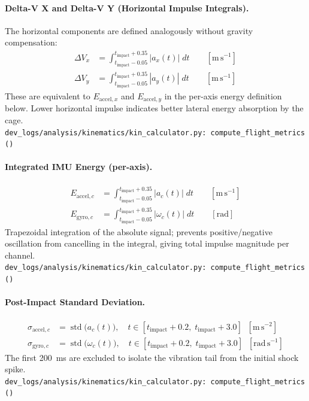 \paragraph{Delta-V X and Delta-V Y (Horizontal Impulse Integrals).}
The horizontal components are defined analogously without gravity compensation:
\begin{align}
    \Delta V_x &= \int_{t_{\text{impact}}-0.05}^{t_{\text{impact}}+0.35} |a_x(t)| \; dt \qquad [\mathrm{m\,s^{-1}}] \\
    \Delta V_y &= \int_{t_{\text{impact}}-0.05}^{t_{\text{impact}}+0.35} |a_y(t)| \; dt \qquad [\mathrm{m\,s^{-1}}]
\end{align}
These are equivalent to $E_{\text{accel},x}$ and $E_{\text{accel},y}$ in the per-axis energy definition below. Lower horizontal impulse indicates better lateral energy absorption by the cage.\\
\texttt{\small dev\_logs/analysis/kinematics/kin\_calculator.py:\ compute\_flight\_metrics()}

\medskip
\paragraph{Integrated IMU Energy (per-axis).}
\begin{align}
    E_{\text{accel},c} &= \int_{t_{\text{impact}}-0.05}^{t_{\text{impact}}+0.35} |a_c(t)| \; dt \qquad [\mathrm{m\,s^{-1}}] \\
    E_{\text{gyro},c}  &= \int_{t_{\text{impact}}-0.05}^{t_{\text{impact}}+0.35} |\omega_c(t)| \; dt \qquad [\mathrm{rad}]
\end{align}
Trapezoidal integration of the absolute signal; prevents positive/negative oscillation from cancelling in the integral, giving total impulse magnitude per channel.\\
\texttt{\small dev\_logs/analysis/kinematics/kin\_calculator.py:\ compute\_flight\_metrics()}

\medskip
\paragraph{Post-Impact Standard Deviation.}
\begin{align}
    \sigma_{\text{accel},c} &= \operatorname{std}\bigl(a_c(t)\bigr),\quad t \in [t_{\text{impact}} + 0.2,\; t_{\text{impact}} + 3.0] \;\;[\mathrm{m\,s^{-2}}] \\
    \sigma_{\text{gyro},c}  &= \operatorname{std}\bigl(\omega_c(t)\bigr),\quad t \in [t_{\text{impact}} + 0.2,\; t_{\text{impact}} + 3.0] \;\;[\mathrm{rad\,s^{-1}}]
\end{align}
The first 200~ms are excluded to isolate the vibration tail from the initial shock spike.\\
\texttt{\small dev\_logs/analysis/kinematics/kin\_calculator.py:\ compute\_flight\_metrics()}

